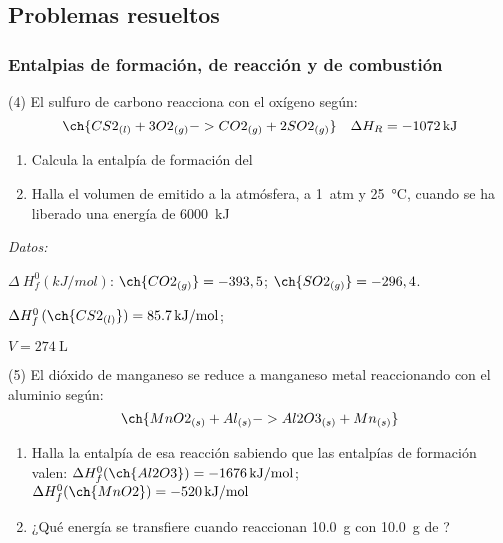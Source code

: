 \documentclass[10pt]{article}
\newenvironment{gexdatos}{
      \vspace{2pt}\noindent\textit{Datos: }
    }{\vspace{5pt}}
\begin{document}
\begin{multicols}{2}
\subsection{Problemas resueltos}

\subsubsection{Entalpias de formación, de reacción y de combustión}

\begin{exercise}[
    tags    = {},
    topics  = {química, termodinámica, termoquímica},
    source  = {FQ 1B MGH 2016, p179, e4},
  ]
  (4) El sulfuro de carbono reacciona con el oxígeno según:
   \[ \ch{CS2_{(l)} + 3 O2_{(g)} -> CO2_{(g)} + 2 SO2_{(g)}} \quad \Delta H_R = \SI{-1072}{kJ} \]

  \begin{enumerate}
    \item Calcula la entalpía de formación del 
    \item Halla el volumen de  emitido a la atmósfera, a \SI{1}{atm} y \SI{25}{\celsius}, cuando se ha liberado una energía de \SI{6000}{kJ}
  \end{enumerate}

  \begin{gexdatos}
    \( \Delta\: H^0_f (\si{kJ/mol}) \): \( \ch{CO2_{(g)}} = -393,5 \); \( \ch{SO2_{(g)}} = -296,4 \).
  \end{gexdatos}

\end{exercise}

\begin{solution}
  \begin{enumerate*}
    \item \( \Delta H^0_f \, (\ch{CS2_{(l)}}) = \SI{85.7}{kJ/mol} \); \item \( V = \SI{274}{\liter} \)
  \end{enumerate*}
\end{solution}




\begin{exercise}[
    tags    = {},
    topics  = {química, termodinámica, termoquímica},
    source  = {FQ 1B MGH 2016, p179, e5},
  ]
  (5) El dióxido de manganeso se reduce a manganeso metal reaccionando
  con el aluminio según:
  \[ \ch{MnO2_{(s)} + Al_{(s)} -> Al2O3_{(s)} + Mn_{(s)}} \]

  \begin{enumerate}
    \item Halla la entalpía de esa reacción sabiendo que las entalpías
    de formación valen:
    \( \Delta H^0_f (\ch{Al2O3}) = \SI{-1676}{kJ/mol} \); \( \Delta H^0_f (\ch{MnO2}) = \SI{-520}{kJ/mol} \)
    \item ¿Qué energía se transfiere cuando reaccionan \SI{10.0}{\gram}
     con \SI{10.0}{\gram} de ?
  \end{enumerate}
\end{exercise}


\end{multicols}
\end{document}
